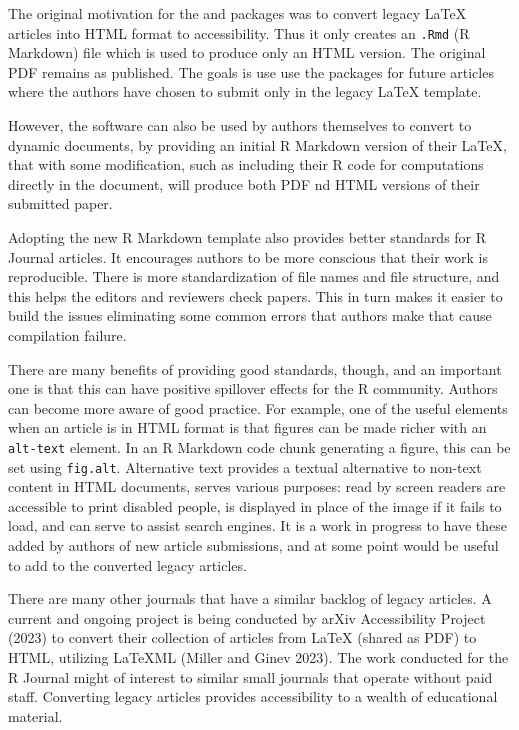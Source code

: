 The original motivation for the  and  packages was to convert legacy LaTeX articles into HTML format to accessibility. Thus it only creates an \texttt{.Rmd} (R Markdown) file which is used to produce only an HTML version. The original PDF remains as published. The goals is use use the packages for future articles where the authors have chosen to submit only in the legacy LaTeX template.

However, the software can also be used by authors themselves to convert to dynamic documents, by providing an initial R Markdown version of their LaTeX, that with some modification, such as including their R code for computations directly in the document, will produce both PDF nd HTML versions of their submitted paper.

Adopting the new R Markdown template also provides better standards for R Journal articles. It encourages authors to be more conscious that their work is reproducible. There is more standardization of file names and file structure, and this helps the editors and reviewers check papers. This in turn makes it easier to build the issues eliminating some common errors that authors make that cause compilation failure.

There are many benefits of providing good standards, though, and an important one is that this can have positive spillover effects for the R community. Authors can become more aware of good practice. For example, one of the useful elements when an article is in HTML format is that figures can be made richer with an \texttt{alt-text} element. In an R Markdown code chunk generating a figure, this can be set using \texttt{fig.alt}. Alternative text provides a textual alternative to non-text content in HTML documents, serves various purposes: read by screen readers are accessible to print disabled people, is displayed in place of the image if it fails to load, and can serve to assist search engines. It is a work in progress to have these added by authors of new article submissions, and at some point would be useful to add to the converted legacy articles.

There are many other journals that have a similar backlog of legacy articles. A current and ongoing project is being conducted by arXiv Accessibility Project (2023) to convert their collection of articles from LaTeX (shared as PDF) to HTML, utilizing LaTeXML (Miller and Ginev 2023). The work conducted for the R Journal might of interest to similar small journals that operate without paid staff. Converting legacy articles provides accessibility to a wealth of educational material.

